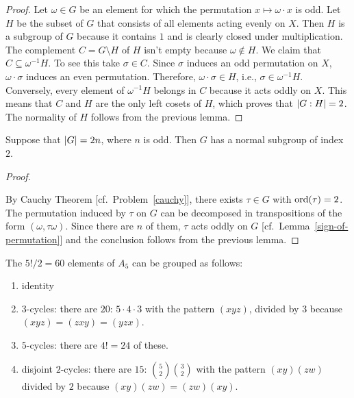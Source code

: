 \begin{proof} Let $\omega\in G$ be an element for which the permutation $x\mapsto\omega\cdot x$ is odd. Let $H$ be the subset of $G$ that consists of all elements acting evenly on $X$. Then $H$ is a subgroup of $G$ because it contains $1$ and is clearly closed under multiplication. The complement $C=G\setminus H$ of $H$ isn't empty because $\omega\notin H$. We claim that $C\subseteq \omega^{-1}H$. To see this take $\sigma\in C$. Since $\sigma$ induces an odd permutation on $X$, $\omega\cdot\sigma$ induces an even permutation. Therefore, $\omega\cdot\sigma\in H$, i.e., $\sigma\in\omega^{-1}H$. Conversely, every element of $\omega^{-1}H$ belongs in $C$ because it acts oddly on $X$. This means that $C$ and $H$ are the only left cosets of $H$, which proves that $\left\vert{G: H}\right\vert=2$. The normality of $H$ follows from the previous lemma.  \end{proof}

\begin{thm}\label{thm-2odd}
    Suppose that\/ $\left\vert{G}\right\vert=2n$, where $n$ is odd. Then\/ $G$ has a normal subgroup of index $2$.
\end{thm}

\begin{proof}${}$

By Cauchy Theorem [cf.~Problem~\ref{cauchy}], there exists $\tau\in G$ with ${\rm ord}(\tau)=2$. The permutation induced by $\tau$ on $G$ can be decomposed in transpositions of the form $(\omega,\tau\omega)$. Since there are $n$ of them, $\tau$ acts oddly on $G$ [cf.~Lemma~\ref{sign-of-permutation}] and the conclusion follows from the previous lemma.  \end{proof}

\begin{xmpl}\label{A5-elements}
    The $5!/2=60$ elements of $A_5$ can be grouped as follows:
    \begin{enumerate}[-]
        \item {\rm identity}
        \item {\rm $3$-cycles:} there are $20$: $5\cdot4\cdot3$ with the pattern $(xyz)$, divided by $3$ because $(xyz)=(zxy)=(yzx)$.
        \item {\rm $5$-cycles:} there are $4!=24$ of these.
        \item {\rm disjoint $2$-cycles:} there are $15$: $\binom52\binom32$ with the pattern $(xy)(zw)$ divided by $2$ because $(xy)(zw)=(zw)(xy)$.
    \end{enumerate}
\end{xmpl}


